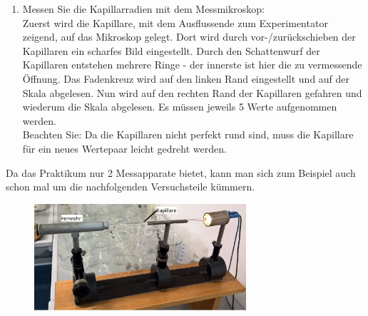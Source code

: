 \begin{enumerate}
%
 \item Messen Sie die Kapillarradien mit dem Messmikroskop: \\
 Zuerst wird die Kapillare, mit dem Ausflussende zum Experimentator zeigend, auf das Mikroskop gelegt. Dort wird durch vor-/zurückschieben der Kapillaren ein scharfes Bild eingestellt. Durch den  Schattenwurf der Kapillaren entstehen mehrere Ringe - der innerste ist hier die zu vermessende Öffnung. Das Fadenkreuz wird auf den linken Rand eingestellt und auf der Skala abgelesen. Nun wird auf den rechten Rand der Kapillaren gefahren und wiederum die Skala abgelesen. Es müssen jeweils 5 Werte aufgenommen werden.\\
 Beachten Sie: Da die Kapillaren nicht perfekt rund sind, muss die Kapillare für ein neues Wertepaar leicht gedreht werden.
\end{enumerate}
%
\begin{hint}
	Da das Praktikum nur 2 Messapparate bietet, kann man sich zum Beispiel auch schon mal um die nachfolgenden Versuchsteile kümmern.
\end{hint}
\begin{figure}[ht]
	\centering
		\includegraphics[width=0.7\textwidth]{Abbildungen/V7-1.jpg}
	\label{fig:V7-1}
\end{figure}

